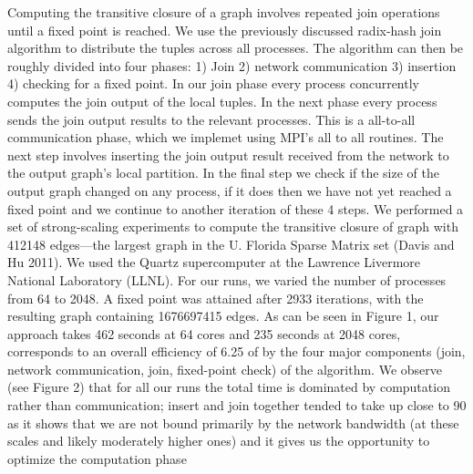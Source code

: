 Computing the transitive closure of a graph involves repeated join operations until a fixed point is reached. We
use the previously discussed radix-hash join algorithm to distribute the tuples across all processes. The algorithm
can then be roughly divided into four phases: 1) Join 2) network communication 3) insertion 4) checking for a
fixed point. In our join phase every process concurrently computes the join output of the local tuples. In the next
phase every process sends the join output results to the relevant processes. This is a all-to-all communication
phase, which we implemet using MPI’s all to all routines. The next step involves inserting the join output result
received from the network to the output graph’s local partition. In the final step we check if the size of the
output graph changed on any process, if it does then we have not yet reached a fixed point and we continue to
another iteration of these 4 steps.
We performed a set of strong-scaling experiments to compute the transitive closure of graph with 412148
edges—the largest graph in the U. Florida Sparse Matrix set (Davis and Hu 2011). We used the Quartz supercomputer
at the Lawrence Livermore National Laboratory (LLNL). For our runs, we varied the number of processes
from 64 to 2048. A fixed point was attained after 2933 iterations, with the resulting graph containing 1676697415
edges. As can be seen in Figure 1, our approach takes 462 seconds at 64 cores and 235 seconds at 2048 cores, corresponds
to an overall efficiency of 6.25%
of by the four major components (join, network communication, join, fixed-point check) of the algorithm. We
observe (see Figure 2) that for all our runs the total time is dominated by computation rather than communication;
insert and join together tended to take up close to 90%
as it shows that we are not bound primarily by the network bandwidth (at these scales and likely moderately
higher ones) and it gives us the opportunity to optimize the computation phase


